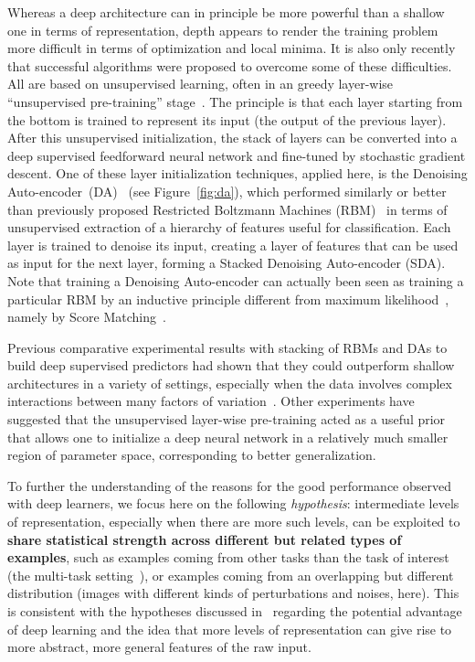 \documentclass{article} %
\begin{document}
Whereas a deep architecture can in principle be more powerful than a
shallow one in terms of representation, depth appears to render the
training problem more difficult in terms of optimization and local minima.
It is also only recently that successful algorithms were proposed to
overcome some of these difficulties.  All are based on unsupervised
learning, often in an greedy layer-wise ``unsupervised pre-training''
stage~\citep{Bengio-2009}.  
The principle is that each layer starting from
the bottom is trained to represent its input (the output of the previous
layer). After this
unsupervised initialization, the stack of layers can be
converted into a deep supervised feedforward neural network and fine-tuned by
stochastic gradient descent.
One of these layer initialization techniques,
applied here, is the Denoising
Auto-encoder~(DA)~\citep{VincentPLarochelleH2008-very-small} (see
Figure~\ref{fig:da}), which performed similarly or 
better~\citep{VincentPLarochelleH2008-very-small} than previously
proposed Restricted Boltzmann Machines (RBM)~\citep{Hinton06} 
in terms of unsupervised extraction
of a hierarchy of features useful for classification. Each layer is trained
to denoise its input, creating a layer of features that can be used as
input for the next layer, forming a Stacked Denoising Auto-encoder (SDA).
Note that training a Denoising Auto-encoder
can actually been seen as training a particular RBM by an inductive
principle different from maximum likelihood~\citep{Vincent-SM-2010}, 
namely by Score Matching~\citep{Hyvarinen-2005,HyvarinenA2008}. 

Previous comparative experimental results with stacking of RBMs and DAs
to build deep supervised predictors had shown that they could outperform
shallow architectures in a variety of settings, especially
when the data involves complex interactions between many factors of 
variation~\citep{LarochelleH2007,Bengio-2009}. Other experiments have suggested
that the unsupervised layer-wise pre-training acted as a useful
prior~\citep{Erhan+al-2010} that allows one to initialize a deep
neural network in a relatively much smaller region of parameter space, 
corresponding to better generalization.

To further the understanding of the reasons for the good performance
observed with deep learners, we focus here on the following {\em hypothesis}:
intermediate levels of representation, especially when there are
more such levels, can be exploited to {\bf share
statistical strength across different but related types of examples},
such as examples coming from other tasks than the task of interest
(the multi-task setting~\citep{caruana97a}), or examples coming from an overlapping
but different distribution (images with different kinds of perturbations
and noises, here). This is consistent with the hypotheses discussed
in~\citet{Bengio-2009} regarding the potential advantage
of deep learning and the idea that more levels of representation can
give rise to more abstract, more general features of the raw input.
\end{document}
